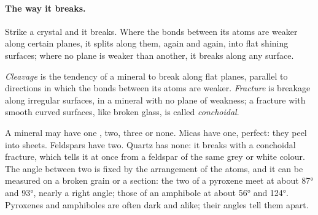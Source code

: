 \paragraph{The way it breaks.} Strike a crystal and it breaks. Where the
bonds between its atoms are weaker along certain planes, it splits along
them, again and again, into flat shining surfaces; where no plane is weaker
than another, it breaks along any surface.

\begin{definition}\label{def:g11:minerals:cleavage}
\emph{Cleavage} is the tendency of a mineral
to break along flat planes, parallel to directions in which the bonds
between its atoms are weaker. \emph{Fracture}
is breakage along irregular surfaces, in a mineral with no plane of
weakness; a fracture with smooth curved surfaces, like broken glass, is
called \emph{conchoidal}.
\end{definition}

A mineral may have one , two, three or none. Micas have one, perfect:
they peel into sheets. Feldspars have two. Quartz has none: it breaks with a
conchoidal fracture, which tells it at once from a feldspar of the same grey
or white colour. The angle between two  is fixed by the arrangement
of the atoms, and it can be measured on a broken grain or a section: the two
 of a pyroxene meet at about \ang{87} and \ang{93}, nearly a right
angle; those of an amphibole at about \ang{56} and \ang{124}. Pyroxenes and
amphiboles are often dark and alike; their  angles tell them apart.

